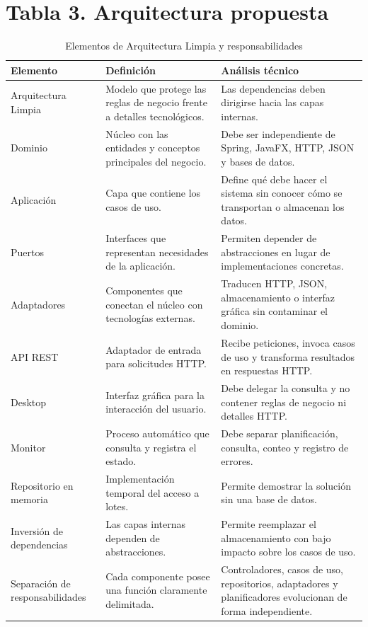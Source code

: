 \documentclass[12pt,letterpaper]{article}
\begin{document}
\section{Tabla 3. Arquitectura propuesta}
\begin{table}[!ht]
\centering
\caption{Elementos de Arquitectura Limpia y responsabilidades}
\label{tab:arquitectura}
\small\singlespacing
{}
\begin{tabularx}{\textwidth}{@{}P{3.05cm}P{4.0cm}Y@{}}
\toprule
{}\color{white}\textbf{Elemento} & \color{white}\textbf{Definición} & \color{white}\textbf{Análisis técnico}\\
\midrule
Arquitectura Limpia & Modelo que protege las reglas de negocio frente a detalles tecnológicos. & Las dependencias deben dirigirse hacia las capas internas.\\
Dominio & Núcleo con las entidades y conceptos principales del negocio. & Debe ser independiente de Spring, JavaFX, HTTP, JSON y bases de datos.\\
Aplicación & Capa que contiene los casos de uso. & Define qué debe hacer el sistema sin conocer cómo se transportan o almacenan los datos.\\
Puertos & Interfaces que representan necesidades de la aplicación. & Permiten depender de abstracciones en lugar de implementaciones concretas.\\
Adaptadores & Componentes que conectan el núcleo con tecnologías externas. & Traducen HTTP, JSON, almacenamiento o interfaz gráfica sin contaminar el dominio.\\
API REST & Adaptador de entrada para solicitudes HTTP. & Recibe peticiones, invoca casos de uso y transforma resultados en respuestas HTTP.\\
Desktop & Interfaz gráfica para la interacción del usuario. & Debe delegar la consulta y no contener reglas de negocio ni detalles HTTP.\\
Monitor & Proceso automático que consulta y registra el estado. & Debe separar planificación, consulta, conteo y registro de errores.\\
Repositorio en memoria & Implementación temporal del acceso a lotes. & Permite demostrar la solución sin una base de datos.\\
Inversión de dependencias & Las capas internas dependen de abstracciones. & Permite reemplazar el almacenamiento con bajo impacto sobre los casos de uso.\\
Separación de responsabilidades & Cada componente posee una función claramente delimitada. & Controladores, casos de uso, repositorios, adaptadores y planificadores evolucionan de forma independiente.\\

\end{tabularx}
\end{table}
\end{document}
